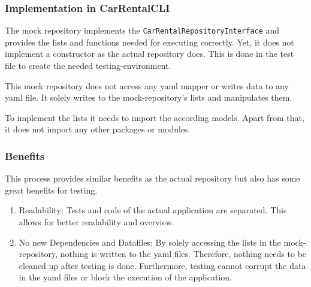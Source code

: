\subsubsection*{Implementation in CarRentalCLI}
The mock repository implements the \texttt{CarRentalRepositoryInterface} and provides the lists and functions needed for executing correctly.
Yet, it does not implement a constructor as the actual repository does.
This is done in the test file to create the needed testing-environment.

This mock repository does not access any yaml mapper or writes data to any yaml file.
It solely writes to the mock-repository's lists and manipulates them.

To implement the lists it needs to import the according models.
Apart from that, it does not import any other packages or modules.

\subsubsection*{Benefits}
This process provides similar benefits as the actual repository but also has some great benefits for testing.
\begin{enumerate}
    \item Readability: Tests and code of the actual application are separated.
          This allows for better readability and overview.
    \item No new Dependencies and Datafiles: By solely accessing the lists in the mock-repository, nothing is written to the yaml files.
          Therefore, nothing needs to be cleaned up after testing is done.
          Furthermore, testing cannot corrupt the data in the yaml files or block the execution of the application.
\end{enumerate}
